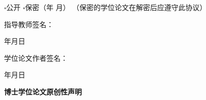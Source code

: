 \noindent
{}

\vspace{0.25cm}

\noindent
\hspace*{2em}%
$\square$公开
\hspace{2em}%
$\square$保密（\underline{\hspace{1.2cm}}年%
\underline{\hspace{1.2cm}}月）
（保密的学位论文在解密后应遵守此协议）

\vspace{0.45cm}

\noindent
\begin{minipage}[t]{0.47\textwidth}
指导教师签名：

\vspace{0.55cm}

\hfill
年\hspace{1.5em}月\hspace{1.5em}日
\end{minipage}
\hfill
\begin{minipage}[t]{0.47\textwidth}
学位论文作者签名：

\vspace{0.55cm}

\hfill
年\hspace{1.5em}月\hspace{1.5em}日
\end{minipage}

\endgroup

\clearpage

\clearpage
\thispagestyle{empty}

\begingroup


\begin{center}
\vspace*{0.35cm}

{\heiti\bfseries\fontsize{18bp}{27bp}\selectfont
博士学位论文原创性声明
\par}

\end{center}

